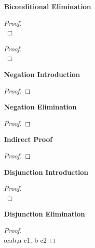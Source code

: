 \begin{multicols}{2}
\vspace{1em}\noindent\textbf{Biconditional Elimination}
\begin{proof}
\\	
	 
\end{proof}

\end{multicols}

\newpage
\begin{multicols}{2}
\begin{proof}
\\	
	 
\end{proof}



\vspace{1em}\noindent\textbf{Negation Introduction}

\begin{proof}
	\open
	 
	\close
\end{proof}


\vspace{1em}\noindent\textbf{Negation Elimination}

\begin{proof}
\end{proof}

\vspace{1em}\noindent\textbf{Indirect Proof}

\begin{proof}
	\open
	 
	\close
\end{proof}

\vspace{1em}\noindent\textbf{Disjunction Introduction}

\begin{proof}

\\	
\end{proof}

\vspace{1em}\noindent\textbf{Disjunction Elimination}

\begin{proof}
\\	\open
		 
	\close
	\open
		 
	\close
	 \oe{ab,a-c1, b-c2}
\end{proof}




\end{multicols}

